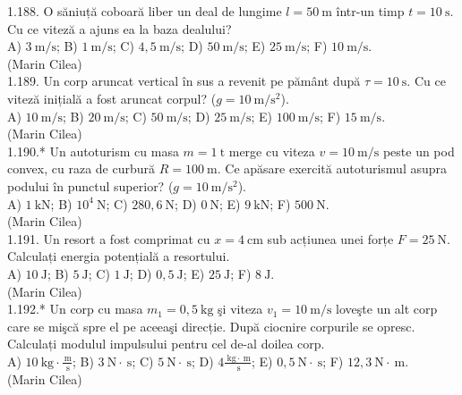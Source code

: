 1.188. O săniuță coboară liber un deal de lungime $l=50 \mathrm{~m}$ într-un timp $t=10 \mathrm{~s}$. Cu ce viteză a ajuns ea la baza dealului?\\ A) $3 \mathrm{~m} / \mathrm{s}$; B) $1 \mathrm{~m} / \mathrm{s}$; C) $4,5 \mathrm{~m} / \mathrm{s}$; D) $50 \mathrm{~m} / \mathrm{s}$; E) $25 \mathrm{~m} / \mathrm{s}$; F) $10 \mathrm{~m} / \mathrm{s}$.\\ (Marin Cilea)\\

1.189. Un corp aruncat vertical în sus a revenit pe pământ după $\tau=10 \mathrm{~s}$. Cu ce viteză inițială a fost aruncat corpul? ($g=10 \mathrm{~m} / \mathrm{s}^{2}$).\\ A) $10 \mathrm{~m} / \mathrm{s}$; B) $20 \mathrm{~m} / \mathrm{s}$; C) $50 \mathrm{~m} / \mathrm{s}$; D) $25 \mathrm{~m} / \mathrm{s}$; E) $100 \mathrm{~m} / \mathrm{s}$; F) $15 \mathrm{~m} / \mathrm{s}$.\\ (Marin Cilea)\\

1.190.* Un autoturism cu masa $m=1 \mathrm{~t}$ merge cu viteza $v=10 \mathrm{~m} / \mathrm{s}$ peste un pod convex, cu raza de curbură $R=100 \mathrm{~m}$. Ce apăsare exercită autoturismul asupra podului în punctul superior? ($g=10 \mathrm{~m} / \mathrm{s}^{2}$).\\ A) $1 \mathrm{~kN}$; B) $10^{4} \mathrm{~N}$; C) $280,6 \mathrm{~N}$; D) $0 \mathrm{~N}$; E) $9 \mathrm{~kN}$; F) $500 \mathrm{~N}$.\\ (Marin Cilea)\\

1.191. Un resort a fost comprimat cu $x=4 \mathrm{~cm}$ sub acțiunea unei forțe $F=25 \mathrm{~N}$. Calculați energia potențială a resortului.\\ A) $10 \mathrm{~J}$; B) $5 \mathrm{~J}$; C) $1 \mathrm{~J}$; D) $0,5 \mathrm{~J}$; E) $25 \mathrm{~J}$; F) $8 \mathrm{~J}$.\\ (Marin Cilea)\\

1.192.* Un corp cu masa $m_{1}=0,5 \mathrm{~kg}$ şi viteza $v_{1}=10 \mathrm{~m} / \mathrm{s}$ loveşte un alt corp care se mişcă spre el pe aceeaşi direcție. După ciocnire corpurile se opresc. Calculați modulul impulsului pentru cel de-al doilea corp.\\ A) $10 \mathrm{~kg} \cdot \frac{\mathrm{~m}}{\mathrm{~s}}$; B) $3 \mathrm{~N} \cdot \mathrm{~s}$; C) $5 \mathrm{~N} \cdot \mathrm{~s}$; D) $4 \frac{\mathrm{~kg} \cdot \mathrm{~m}}{\mathrm{~s}}$; E) $0,5 \mathrm{~N} \cdot \mathrm{~s}$; F) $12,3 \mathrm{~N} \cdot \mathrm{~m}$.\\ (Marin Cilea)\\

